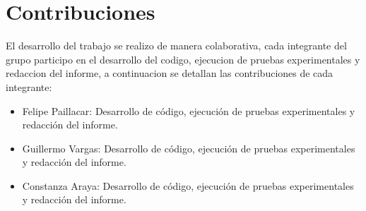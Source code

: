 \documentclass[9pt,letterpaper,onecolumn]{rho-class/rho}
\begin{document}
\newpage
\section{Contribuciones}
El desarrollo del trabajo se realizo de manera colaborativa, cada integrante del grupo participo en el desarrollo del codigo, 
ejecucion de pruebas experimentales y redaccion del informe, a continuacion se detallan las contribuciones de cada integrante:
\begin{itemize}
    \item Felipe Paillacar: Desarrollo de código, ejecución de pruebas experimentales y redacción del informe.  
    \item Guillermo Vargas: Desarrollo de código, ejecución de pruebas experimentales y redacción del informe.
    \item Constanza Araya: Desarrollo de código, ejecución de pruebas experimentales y redacción del informe.
\end{itemize}

\newpage
\nocite{*}
\printbibliography

\end{document}
